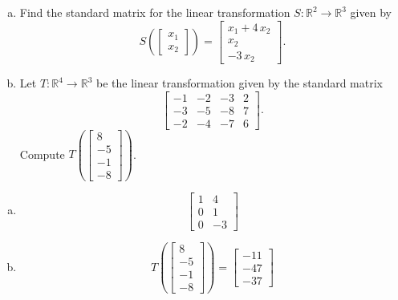 
\begin{exerciseStatement}

\begin{enumerate}[(a)]
\item Find the standard matrix for the linear transformation \(S:\mathbb{R}^ 2  \to \mathbb{R}^ 3 \) given by \[S\left(  \left[\begin{array}{c}
x_{1} \\
x_{2}
\end{array}\right]  \right) =  \left[\begin{array}{c}
x_{1} + 4 \, x_{2} \\
x_{2} \\
-3 \, x_{2}
\end{array}\right] .\]
\item Let \(T:\mathbb{R}^ 4  \to \mathbb{R}^ 3 \) be the linear transformation given by the standard matrix \[ \left[\begin{array}{cccc}
-1 & -2 & -3 & 2 \\
-3 & -5 & -8 & 7 \\
-2 & -4 & -7 & 6
\end{array}\right] .\] Compute \(T\left( \left[\begin{array}{c}
8 \\
-5 \\
-1 \\
-8
\end{array}\right]  \right)\). 
\end{enumerate}
    
\end{exerciseStatement}
    
\begin{exerciseAnswer} 

\begin{enumerate}[(a)]
\item \[ \left[\begin{array}{cc}
1 & 4 \\
0 & 1 \\
0 & -3
\end{array}\right] \]
\item \[T\left( \left[\begin{array}{c}
8 \\
-5 \\
-1 \\
-8
\end{array}\right]  \right)= \left[\begin{array}{c}
-11 \\
-47 \\
-37
\end{array}\right] \]
\end{enumerate}
    
\end{exerciseAnswer}
    

